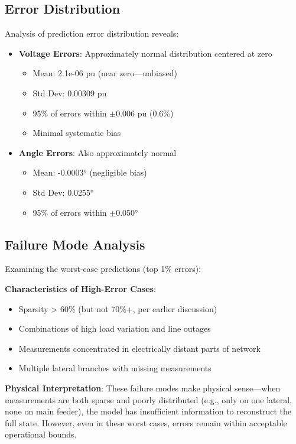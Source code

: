 \documentclass[12pt,a4paper]{report}
\begin{document}
\subsection{Error Distribution}

Analysis of prediction error distribution reveals:

\begin{itemize}
    \item \textbf{Voltage Errors}: Approximately normal distribution centered at zero
    \begin{itemize}
        \item Mean: 2.1e-06 pu (near zero—unbiased)
        \item Std Dev: 0.00309 pu
        \item 95\% of errors within $\pm$0.006 pu (0.6\%)
        \item Minimal systematic bias
    \end{itemize}
    
    \item \textbf{Angle Errors}: Also approximately normal
    \begin{itemize}
        \item Mean: -0.0003° (negligible bias)
        \item Std Dev: 0.0255°
        \item 95\% of errors within $\pm$0.050°
    \end{itemize}
\end{itemize}

\subsection{Failure Mode Analysis}

Examining the worst-case predictions (top 1\% errors):

\textbf{Characteristics of High-Error Cases}:
\begin{itemize}
    \item Sparsity > 60\% (but not 70\%+, per earlier discussion)
    \item Combinations of high load variation and line outages
    \item Measurements concentrated in electrically distant parts of network
    \item Multiple lateral branches with missing measurements
\end{itemize}

\textbf{Physical Interpretation}:
These failure modes make physical sense—when measurements are both sparse and poorly distributed (e.g., only on one lateral, none on main feeder), the model has insufficient information to reconstruct the full state. However, even in these worst cases, errors remain within acceptable operational bounds.
\end{document}
